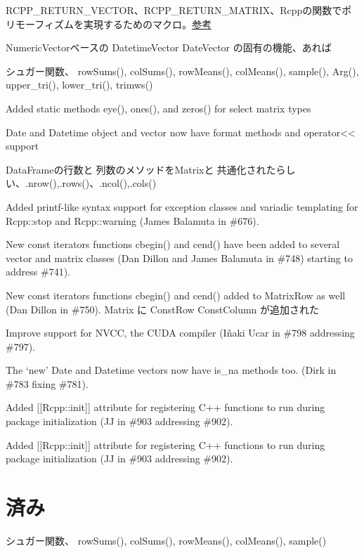 \documentclass[]{book}
\begin{document}
RCPP\_RETURN\_VECTOR、RCPP\_RETURN\_MATRIX、Rcppの関数でポリモーフィズムを実現するためのマクロ。\href{http://gallery.rcpp.org/articles/rcpp-return-macros/}{参考}

NumericVectorベースの DatetimeVector DateVector の固有の機能、あれば

シュガー関数、 rowSums(), colSums(), rowMeans(), colMeans(), sample(), Arg(), upper\_tri(), lower\_tri(), trimws()

Added static methods eye(), ones(), and zeros() for select matrix types

Date and Datetime object and vector now have format methods and operator\textless{}\textless{} support

DataFrameの行数と列数のメソッドをMatrixと共通化されたらしい、.nrow(),.rows()、.ncol(),.cols()

Added printf-like syntax support for exception classes and variadic templating for Rcpp::stop and Rcpp::warning (James Balamuta in \#676).

New const iterators functions cbegin() and cend() have been added to several vector and matrix classes (Dan Dillon and James Balamuta in \#748) starting to address \#741).

New const iterators functions cbegin() and cend() added to MatrixRow as well (Dan Dillon in \#750). Matrix に ConstRow ConstColumn が追加された

Improve support for NVCC, the CUDA compiler (Iñaki Ucar in \#798 addressing \#797).

The `new' Date and Datetime vectors now have is\_na methods too. (Dirk in \#783 fixing \#781).

Added {[}{[}Rcpp::init{]}{]} attribute for registering C++ functions to run during package initialization (JJ in \#903 addressing \#902).

Added {[}{[}Rcpp::init{]}{]} attribute for registering C++ functions to run during package initialization (JJ in \#903 addressing \#902).

\chapter{済み}

シュガー関数、 rowSums(), colSums(), rowMeans(), colMeans(), sample()
\end{document}
